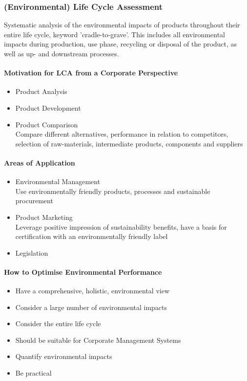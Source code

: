 \documentclass[11pt]{article}
\theoremstyle{definition}
\begin{document}
\subsubsection{(Environmental) Life Cycle Assessment}
Systematic analysis of the environmental impacts of products throughout their entire life cycle, keyword 'cradle-to-grave'. This includes all environmental impacts during production, use phase, recycling or disposal of the product, as well as up- and downstream processes.

\paragraph{Motivation for LCA from a Corporate Perspective}
\begin{itemize}
	\item Product Analysis
	\item Product Development
	\item Product Comparison\\
	Compare different alternatives, performance in relation to competitors, selection of raw-materials, intermediate products, components and suppliers
\end{itemize}
\paragraph{Areas of Application}
\begin{itemize}
	\item Environmental Management\\
	Use environmentally friendly products, processes and sustainable procurement
	\item Product Marketing\\
	Leverage positive impression of sustainability benefits, have a basis for certification with an environmentally friendly label
	\item Legislation
\end{itemize}

\paragraph{How to Optimise Environmental Performance}
\begin{itemize}
	\item Have a comprehensive, holistic, environmental view
	\item Consider a large number of environmental impacts
	\item Consider the entire life cycle
	\item Should be suitable for Corporate Management Systems
	\item Quantify environmental impacts
	\item Be practical
\end{itemize}
\end{document}
